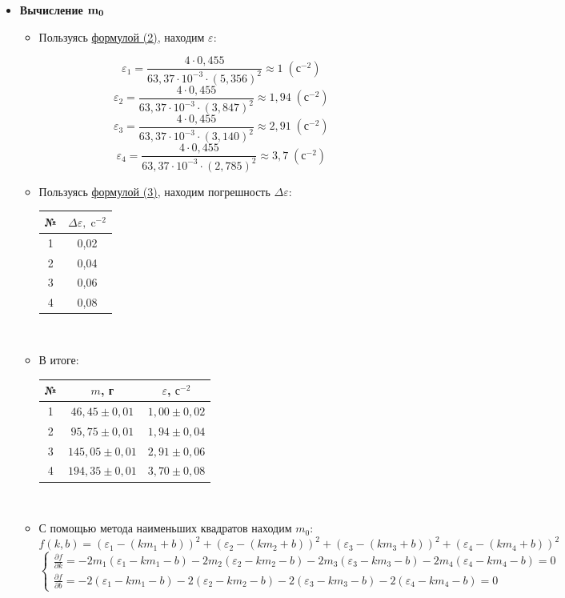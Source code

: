 \documentclass{article}
\begin{document}
\begin{itemize}
	\item {\bf Вычисление $\bf m_0$}
	
	
\begin{itemize}
	\item Пользуясь \hyperlink{formuls}{формулой (2)}, находим $\varepsilon$:
	
	$$\varepsilon_1=\frac{4\cdot0,455}{63,37\cdot10^{-3}\cdot(5,356)^2}\approx1\;\left( \mbox{с}^{-2} \right) $$
	$$\varepsilon_2=\frac{4\cdot0,455}{63,37\cdot10^{-3}\cdot(3,847)^2}\approx1,94\;\left( \mbox{с}^{-2} \right) $$
	$$\varepsilon_3=\frac{4\cdot0,455}{63,37\cdot10^{-3}\cdot(3,140)^2}\approx2,91\;\left( \mbox{с}^{-2} \right) $$
	$$\varepsilon_4=\frac{4\cdot0,455}{63,37\cdot10^{-3}\cdot(2,785)^2}\approx3,7\;\left( \mbox{с}^{-2} \right) $$

	\item Пользуясь \hyperlink{formuls}{формулой (3)}, находим погрешность $\Delta \varepsilon$:
	
	\begin{tabular}{c|c}
		№ & $\Delta \varepsilon,\;\mbox{c}^{-2}$ \\
		\hline
		1 &  0,02\\
		
		2 &  0,04\\
		
		3 &  0,06\\
		
		4 &  0,08\\
	\end{tabular}\\

\item В итоге:

	\begin{tabular}{ c | c | c}
		№	& $m$, г& $\varepsilon$, $\mbox{с}^{-2}$ \\
		\hline
		1 & $46,45\pm0,01 $ &  $  1,00\pm0,02  $\\
		
		2& $ 95,75\pm0,01$ & $ 1,94\pm0,04  $ \\
		
		3& $145,05 \pm0,01 $&  $ 2,91 \pm0,06 $\\
		
		4& $ 194,35\pm0,01 $& $  3,70 \pm0,08$
	\end{tabular}\\

\item С помощью метода наименьших квадратов находим $m_0$:
$$ f(k, b)=\left( \varepsilon_1-(km_1+b)\right) ^2+\left( \varepsilon_2-(km_2+b)\right) ^2+\left( \varepsilon_3-(km_3+b)\right) ^2+\left( \varepsilon_4-(km_4+b)\right) ^2$$
\begin{equation*}
	\begin{cases}
		\frac{\partial f}{\partial k}=-2m_1( \varepsilon_1-km_1-b) - 2m_2( \varepsilon_2-km_2-b) - 2m_3( \varepsilon_3-km_3-b) - 2m_4( \varepsilon_4-km_4-b) =0\\
		\frac{\partial f}{\partial b}=-2( \varepsilon_1-km_1-b) - 2( \varepsilon_2-km_2-b) - 2( \varepsilon_3-km_3-b) - 2( \varepsilon_4-km_4-b) =0
		

\end{cases}
\end{equation*}
\end{itemize}
\end{itemize}
\end{document}
